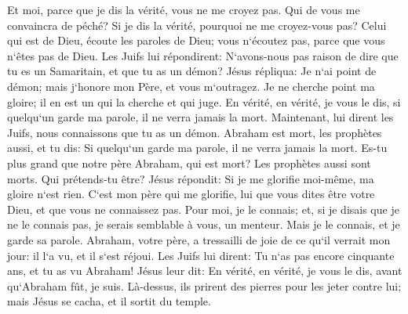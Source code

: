 \verse Et moi, parce que je dis la vérité, vous ne me croyez pas. 
\verse Qui de vous me convaincra de péché? Si je dis la vérité, pourquoi ne me croyez-vous pas? 
\verse Celui qui est de Dieu, écoute les paroles de Dieu; vous n`écoutez pas, parce que vous n`êtes pas de Dieu. 
\verse Les Juifs lui répondirent: N`avons-nous pas raison de dire que tu es un Samaritain, et que tu as un démon? 
\verse Jésus répliqua: Je n`ai point de démon; mais j`honore mon Père, et vous m`outragez. 
\verse Je ne cherche point ma gloire; il en est un qui la cherche et qui juge. 
\verse En vérité, en vérité, je vous le dis, si quelqu`un garde ma parole, il ne verra jamais la mort. 
\verse Maintenant, lui dirent les Juifs, nous connaissons que tu as un démon. Abraham est mort, les prophètes aussi, et tu dis: Si quelqu`un garde ma parole, il ne verra jamais la mort. 
\verse Es-tu plus grand que notre père Abraham, qui est mort? Les prophètes aussi sont morts. Qui prétends-tu être? 
\verse Jésus répondit: Si je me glorifie moi-même, ma gloire n`est rien. C`est mon père qui me glorifie, lui que vous dites être votre Dieu, 
\verse et que vous ne connaissez pas. Pour moi, je le connais; et, si je disais que je ne le connais pas, je serais semblable à vous, un menteur. Mais je le connais, et je garde sa parole. 
\verse Abraham, votre père, a tressailli de joie de ce qu`il verrait mon jour: il l`a vu, et il s`est réjoui. 
\verse Les Juifs lui dirent: Tu n`as pas encore cinquante ans, et tu as vu Abraham! 
\verse Jésus leur dit: En vérité, en vérité, je vous le dis, avant qu`Abraham fût, je suis. 
\verse Là-dessus, ils prirent des pierres pour les jeter contre lui; mais Jésus se cacha, et il sortit du temple. 

\chapter{}

